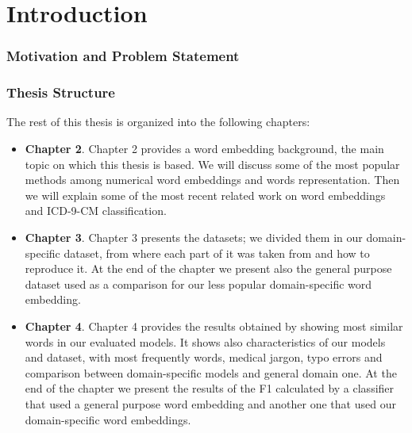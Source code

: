 \chapter{Introduction}

\subsection{Motivation and Problem Statement}


\subsection{Thesis Structure}
The rest of this thesis is organized into the following chapters:
\begin{itemize}
	\item \textbf{Chapter 2}. Chapter 2 provides a word embedding background, the main topic on which this thesis is based. We will discuss some of the most popular methods among numerical word embeddings and words representation. Then we will explain some of the most recent related work on word embeddings and ICD-9-CM classification.
	\item \textbf{Chapter 3}. Chapter 3 presents the datasets; we divided them in our domain-specific dataset, from where each part of it was taken from and how to reproduce it. At the end of the chapter we present also the general purpose dataset used as a comparison for our less popular domain-specific word embedding.
	\item \textbf{Chapter 4}. Chapter 4 provides the results obtained by showing most similar words in our evaluated models. It shows also characteristics of our models and dataset, with most frequently words, medical jargon, typo errors and comparison between domain-specific models and general domain one. At the end of the chapter we present the results of the F1 calculated by a classifier that used a general purpose word embedding and another one that used our domain-specific word embeddings.
\end{itemize}